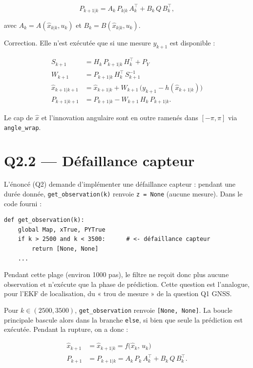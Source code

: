 \documentclass[11pt]{article}
\theoremstyle{remark}
\theoremstyle{definition}
\begin{document}
\begin{equation}
P_{k+1|k} = A_k\,P_{k|k}\,A_k^\top + B_k\,Q\,B_k^\top,
\end{equation}

avec $A_k = A(\hat{x}_{k|k}, u_k)$ et $B_k = B(\hat{x}_{k|k}, u_k)$.

Correction. Elle n'est exécutée que si une mesure $y_{k+1}$ est disponible :

\begin{equation}
\begin{aligned}
S_{k+1} &= H_k\,P_{k+1|k}\,H_k^\top + P_Y \\[2pt]
W_{k+1} &= P_{k+1|k}\,H_k^\top\,S_{k+1}^{-1} \\[2pt]
\hat{x}_{k+1|k+1} &= \hat{x}_{k+1|k} + W_{k+1}\,\big(y_{k+1} - h(\hat{x}_{k+1|k})\big) \\[2pt]
P_{k+1|k+1} &= P_{k+1|k} - W_{k+1}\,H_k\,P_{k+1|k}.
\end{aligned}
\end{equation}

Le cap de $\hat{x}$ et l'innovation angulaire sont en outre ramenés dans $[-\pi, \pi]$ via
\texttt{angle\_wrap}.

\section{Q2.2 --- Défaillance capteur}

L'énoncé (Q2) demande d'implémenter une défaillance capteur : pendant une durée
donnée, \texttt{get\_observation(k)} renvoie \texttt{z = None} (aucune mesure). Dans le code
fourni :

\begin{verbatim}
def get_observation(k):
    global Map, xTrue, PYTrue
    if k > 2500 and k < 3500:      # <- défaillance capteur
        return [None, None]
    ...
\end{verbatim}

Pendant cette plage (environ 1000 pas), le filtre ne reçoit donc plus aucune
observation et n'exécute que la phase de prédiction. Cette question est l'analogue,
pour l'EKF de localisation, du « trou de mesure » de la question Q1 GNSS.

Pour $k \in (2500, 3500)$, \texttt{get\_observation} renvoie \texttt{[None, None]}. La boucle
principale bascule alors dans la branche \texttt{else}, si bien que seule la
prédiction est exécutée. Pendant la rupture, on a donc :

\begin{equation}
\boxed{\begin{aligned}
\hat{x}_{k+1} &= \hat{x}_{k+1|k} = f\big(\hat{x}_k,\, u_k\big) \\[4pt]
P_{k+1} &= P_{k+1|k} = A_k\,P_k\,A_k^\top + B_k\,Q\,B_k^\top .
\end{aligned}}
\end{equation}
\end{document}
